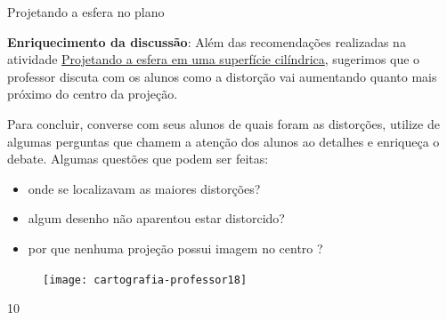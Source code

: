\begin{sugestions}{Projetando a esfera no plano}
{
  \textbf{Enriquecimento da discussão}:
  Além das recomendações realizadas na atividade \hyperref[proj_cil]{Projetando a esfera em uma superfície cilíndrica}, sugerimos que o professor  discuta com os alunos como a distorção vai aumentando quanto mais próximo do centro da projeção.

  Para concluir, converse com seus alunos de quais foram as distorções, utilize de algumas perguntas que chamem a atenção dos alunos ao detalhes e enriqueça o debate. Algumas questões que podem ser feitas:
  \begin{itemize}
  \item onde se localizavam as maiores distorções?
  \item algum desenho não aparentou estar distorcido?
  \item por que nenhuma projeção possui imagem no centro ?
  \end{itemize}

  \begin{figure}[H]
  \centering
  
  \texttt{[image: cartografia-professor18]}
  \end{figure}

  }{1}{0}
\end{sugestions}
\label{Pplanas}

